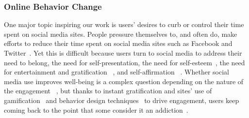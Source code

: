 

\subsubsection{Online Behavior Change}

One major topic inspiring our work is users' desires to curb or control their time spent on social media sites. People pressure themselves to, and often do, make efforts to reduce their time spent on social media sites such as Facebook and Twitter~\cite{Sleeper:2015:ILI:2675133.2675193,schoenebeck2014giving}. Yet this is difficult because users turn to social media to address their need to belong, the need for self-presentation, the need for self-esteem~\cite{nadkarni2012people}, the need for entertainment and gratification ~\cite{raacke2008myspace}, and self-affirmation ~\cite{toma2013self}. Whether social media use improves well-being is a complex question depending on the nature of the engagement ~\cite{uysal2013mediating, marche2012facebook, lin2015emotional, kim2011facebook, muise2009more, sagioglou2014facebook, tandoc2015facebook}, but thanks to instant gratification and sites' use of gamification~\cite{chou2015actionable, zichermann2011gamification, huotari2012defining} and behavior design techniques~\cite{fogg2002persuasive, eyal2014hooked} to drive engagement, users keep coming back to the point that some consider it an addiction~\cite{andreassen2012development, ryan2014uses, tang2016personality, turel2014examination}. %


